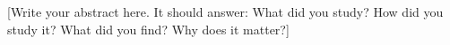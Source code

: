 
[Write your abstract here. It should answer: What did you study? How did you study it? What did you find? Why does it matter?]

